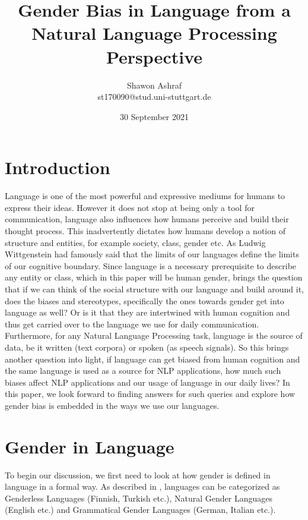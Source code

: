 \documentclass{article}
\title{Gender Bias in Language from a Natural Language Processing Perspective}
\author{Shawon Ashraf \\ st170090@stud.uni-stuttgart.de}
\date{30 September 2021}
\begin{document}
\maketitle

\section*{Introduction}
Language is one of the most powerful and expressive mediums for humans to express their ideas. However it does not stop at being only a tool for communication, language also influences how humans perceive and build their thought process. This inadvertently dictates how humans develop a notion of structure and entities, for example society, class, gender etc. As Ludwig Wittgenstein had famously said that the limits of our languages define the limits of our cognitive boundary. Since language is a necessary prerequisite to describe any entity or class, which in this paper will be human gender, brings the question that if we can think of the social structure with our language and build around it, does the biases and stereotypes, specifically the ones towards gender get into language as well? Or is it that they are intertwined with human cognition and thus get carried over to the language we use for daily communication. Furthermore, for any Natural Language Processing task, language is the source of data, be it written (text corpora) or spoken (as speech signals). So this brings another question into light, if language can get biased from human cognition and the same language is used as a source for NLP applications, how much such biases affect NLP applications and our usage of language in our daily lives? In this paper, we look forward to finding answers for such queries and explore how gender bias is embedded in the ways we use our languages.

\section*{Gender in Language}
To begin our discussion, we first need to look at how gender is defined in language in a formal way. As described in \cite{menegatti2017gender}, languages can be categorized \cite{braun2005cognitive} as Genderless Languages (Finnish, Turkish etc.), Natural Gender Languages (English etc.) and Grammatical Gender Languages (German, Italian etc.).
\end{document}
